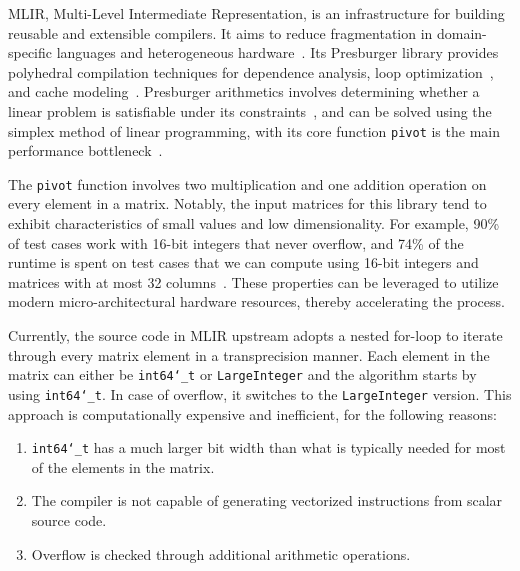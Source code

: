 \documentclass[logo,bsc,singlespacing,parskip]{infthesis}
\newcommand{\dtlong}{\texttt{int64\char`_t}}
\newcommand{\pivot}{\texttt{pivot}}
\begin{document}
MLIR, Multi-Level Intermediate Representation, is an infrastructure for building
reusable and extensible compilers. It aims to reduce fragmentation in domain-specific
languages and heterogeneous hardware~\cite{mlir}. Its Presburger
library provides polyhedral compilation techniques for dependence analysis,
loop optimization~\cite{mliraffine}, and cache modeling~\cite{CacheModel}.
Presburger arithmetics involves determining whether a linear problem is 
satisfiable under its constraints~\cite{SMLPPA}, and can be solved using the
simplex method of linear programming, with its core function \pivot{} is the
main performance bottleneck~\cite{FPL1}. 


The \texttt{pivot} function involves two multiplication and one addition
operation on every element in a matrix. Notably, the input matrices for this
library tend to exhibit characteristics of small values and low dimensionality.
For example, 90\% of test cases work with 16-bit integers that never overflow,
and 74\% of the runtime is spent on test cases that we can compute using
16-bit integers and matrices with at most 32 columns~\cite{FPL2}. These
properties can be leveraged to utilize modern micro-architectural
hardware resources, thereby accelerating the process.

Currently, the source code in MLIR upstream adopts a nested for-loop to iterate
through every matrix element in a transprecision manner. Each element in
the matrix can either be \dtlong{} or \texttt{LargeInteger} and the
algorithm starts by using \dtlong{}. In case of overflow, it switches to
the \texttt{LargeInteger} version. This approach is computationally expensive
and inefficient, for the following reasons: 
\begin{enumerate}

\item \dtlong{} has a much larger bit width than what is typically
needed for most of the elements in the matrix.

\item The compiler is not capable of generating vectorized instructions from
scalar source code.

\item Overflow is checked through additional arithmetic
operations.

\end{enumerate}
\end{document}

